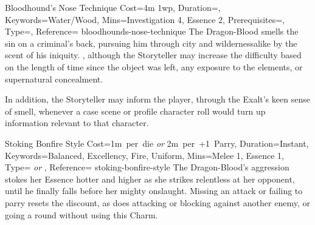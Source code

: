 \begin{Charm}{Bloodhound's Nose Technique}{%
    Cost=4m 1wp,
    Duration={\Pool[~days]{\EssenceVal}},
    Keywords=Water/Wood,
    Mins={Investigation 4, Essence 2},
    Prerequisites=,
    Type=\SimpleType,
    Reference=\cite*[p.~199]{db}
}{bloodhounds-nose-technique}
    The Dragon-Blood smells the sin on a criminal's back, pursuing him through city
    and wildernessalike by the scent of his iniquity. , although the Storyteller may increase the difficulty based on
    the length of time since the object was left, any exposure to the elements, or
    supernatural concealment. 

     In addition, the Storyteller may inform the player,
    through the Exalt's keen sense of smell, whenever a case scene or profile
    character roll would turn up information relevant to that character.
\end{Charm}



\DocumentColumnBreak
{}

\begin{Charm}{Stoking Bonfire Style}{%
    Cost={1m~per~die \emph{or} 2m~per~+1~Parry},
    Duration=Instant,
    Keywords={Balanced, Excellency, Fire, Uniform},
    Mins={Melee 1, Essence 1},
    Type={\SupplementalType{} \emph{or} \ReflexiveType},
    Reference=\cite*[p.~225]{db}
}{stoking-bonfire-style}
    The Dragon-Blood's aggression stokes her Essence hotter and higher as she
    strikes relentless at her opponent, until he finally falls before her mighty
    onslaught.  Missing an
    attack or failing to parry resets the discount, as does attacking or blocking
    against another enemy, or going a round without using this Charm.
\end{Charm}


